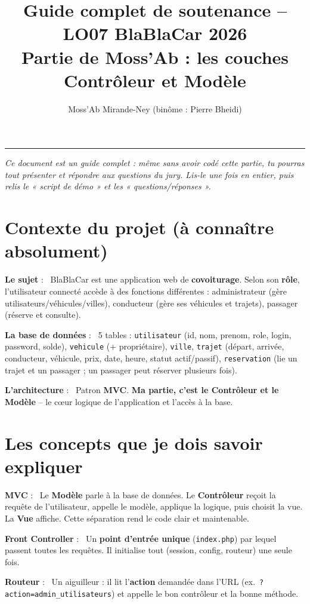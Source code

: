 \documentclass[11pt,a4paper]{article}
\title{\textbf{Guide complet de soutenance -- LO07 BlaBlaCar 2026}\\[0.3em]\large Partie de Moss'Ab : les couches \textbf{Contrôleur} et \textbf{Modèle}}
\author{Moss'Ab Mirande-Ney \quad (binôme : Pierre Bheidi)}
\date{}
\newcommand{\motcle}[1]{\noindent\textbf{\color{bleu}#1} :\ }
\begin{document}
\maketitle
\tableofcontents
\vspace{1em}
\hrule
\vspace{1em}

\noindent\textit{Ce document est un guide complet : même sans avoir codé cette
partie, tu pourras tout présenter et répondre aux questions du jury. Lis-le une
fois en entier, puis relis le « script de démo » et les « questions/réponses ».}

\section{Contexte du projet (à connaître absolument)}

\motcle{Le sujet} BlaBlaCar est une application web de \textbf{covoiturage}. Selon
son \textbf{rôle}, l'utilisateur connecté accède à des fonctions différentes :
administrateur (gère utilisateurs/véhicules/villes), conducteur (gère ses véhicules
et trajets), passager (réserve et consulte).

\motcle{La base de données} 5 tables : \texttt{utilisateur} (id, nom, prenom,
role, login, password, solde), \texttt{vehicule} (+ propriétaire), \texttt{ville},
\texttt{trajet} (départ, arrivée, conducteur, véhicule, prix, date, heure, statut
actif/passif), \texttt{reservation} (lie un trajet et un passager ; un passager
peut réserver plusieurs fois).

\motcle{L'architecture} Patron \textbf{MVC}. \textbf{Ma partie, c'est le Contrôleur
et le Modèle} -- le cœur logique de l'application et l'accès à la base.

\section{Les concepts que je dois savoir expliquer}

\motcle{MVC} Le \textbf{Modèle} parle à la base de données. Le \textbf{Contrôleur}
reçoit la requête de l'utilisateur, appelle le modèle, applique la logique, puis
choisit la vue. La \textbf{Vue} affiche. Cette séparation rend le code clair et
maintenable.

\motcle{Front Controller} Un \textbf{point d'entrée unique} (\texttt{index.php})
par lequel passent toutes les requêtes. Il initialise tout (session, config,
routeur) une seule fois.

\motcle{Routeur} Un aiguilleur : il lit l'\textbf{action} demandée dans l'URL
(ex.~\texttt{?action=admin\_utilisateurs}) et appelle le bon contrôleur et la bonne
méthode.
\end{document}

